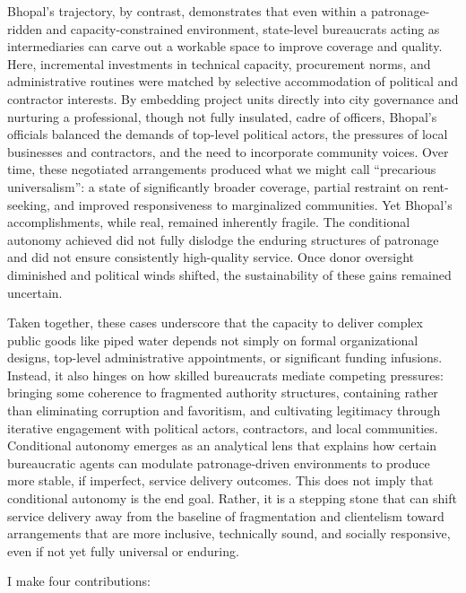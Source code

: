 Bhopal’s trajectory, by contrast, demonstrates that even within a patronage-ridden and capacity-constrained environment, state-level bureaucrats acting as intermediaries can carve out a workable space to improve coverage and quality. Here, incremental investments in technical capacity, procurement norms, and administrative routines were matched by selective accommodation of political and contractor interests. By embedding project units directly into city governance and nurturing a professional, though not fully insulated, cadre of officers, Bhopal’s officials balanced the demands of top-level political actors, the pressures of local businesses and contractors, and the need to incorporate community voices. Over time, these negotiated arrangements produced what we might call “precarious universalism”: a state of significantly broader coverage, partial restraint on rent-seeking, and improved responsiveness to marginalized communities. Yet Bhopal’s accomplishments, while real, remained inherently fragile. The conditional autonomy achieved did not fully dislodge the enduring structures of patronage and did not ensure consistently high-quality service. Once donor oversight diminished and political winds shifted, the sustainability of these gains remained uncertain.

Taken together, these cases underscore that the capacity to deliver complex public goods like piped water depends not simply on formal organizational designs, top-level administrative appointments, or significant funding infusions. Instead, it also hinges on how skilled bureaucrats mediate competing pressures: bringing some coherence to fragmented authority structures, containing rather than eliminating corruption and favoritism, and cultivating legitimacy through iterative engagement with political actors, contractors, and local communities. Conditional autonomy emerges as an analytical lens that explains how certain bureaucratic agents can modulate patronage-driven environments to produce more stable, if imperfect, service delivery outcomes. This does not imply that conditional autonomy is the end goal. Rather, it is a stepping stone that can shift service delivery away from the baseline of fragmentation and clientelism toward arrangements that are more inclusive, technically sound, and socially responsive, even if not yet fully universal or enduring.


I make four contributions:


